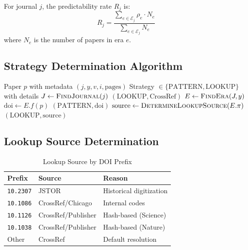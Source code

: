 \begin{definition}
For journal $j$, the predictability rate $R_j$ is:
\begin{equation}
R_j = \frac{\sum_{e \in \mathcal{E}_j} \rho_e \cdot N_e}{\sum_{e \in \mathcal{E}_j} N_e}
\end{equation}
where $N_e$ is the number of papers in era $e$.
\end{definition}

\subsection{Strategy Determination Algorithm}

\begin{algorithm}[H]
\caption{DOI Strategy Determination}
\label{alg:doi-strategy}
\begin{algorithmic}[1]
\Require Paper $p$ with metadata $(j, y, v, i, \text{pages})$
\Ensure Strategy $\in \{\text{PATTERN}, \text{LOOKUP}\}$ with details
\State $J \gets \textsc{FindJournal}(j)$
    \State \Return $(\text{LOOKUP}, \text{CrossRef})$
\EndIf
\State $E \gets \textsc{FindEra}(J, y)$
 
        \State $\text{doi} \gets E.f(p)$ 
        \State \Return $(\text{PATTERN}, \text{doi})$
    \EndIf
\EndIf
\State $\text{source} \gets \textsc{DetermineLookupSource}(E.\pi)$
\State \Return $(\text{LOOKUP}, \text{source})$
\end{algorithmic}
\end{algorithm}

\subsection{Lookup Source Determination}

\begin{table}[h]
\centering
\caption{Lookup Source by DOI Prefix}
\begin{tabular}{lll}
\toprule
\textbf{Prefix} & \textbf{Source} & \textbf{Reason} \\
\midrule
\texttt{10.2307} & JSTOR & Historical digitization \\
\texttt{10.1086} & CrossRef/Chicago & Internal codes \\
\texttt{10.1126} & CrossRef/Publisher & Hash-based (Science) \\
\texttt{10.1038} & CrossRef/Publisher & Hash-based (Nature) \\
Other & CrossRef & Default resolution \\
\bottomrule
\end{tabular}
\end{table}


